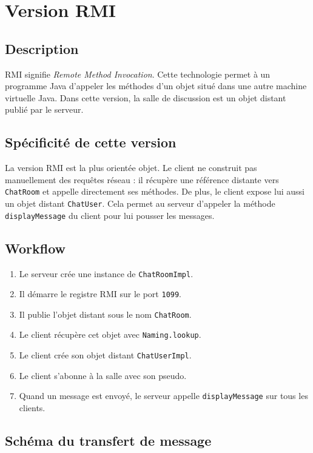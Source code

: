 \documentclass[12pt,a4paper]{report}
\begin{document}
\chapter{Version RMI}

\section{Description}

RMI signifie \textit{Remote Method Invocation}. Cette technologie permet à un programme Java d'appeler les méthodes d'un objet situé dans une autre machine virtuelle Java. Dans cette version, la salle de discussion est un objet distant publié par le serveur.

\section{Spécificité de cette version}

La version RMI est la plus orientée objet. Le client ne construit pas manuellement des requêtes réseau : il récupère une référence distante vers \texttt{ChatRoom} et appelle directement ses méthodes. De plus, le client expose lui aussi un objet distant \texttt{ChatUser}. Cela permet au serveur d'appeler la méthode \texttt{displayMessage} du client pour lui pousser les messages.

\section{Workflow}

\begin{enumerate}
    \item Le serveur crée une instance de \texttt{ChatRoomImpl}.
    \item Il démarre le registre RMI sur le port \texttt{1099}.
    \item Il publie l'objet distant sous le nom \texttt{ChatRoom}.
    \item Le client récupère cet objet avec \texttt{Naming.lookup}.
    \item Le client crée son objet distant \texttt{ChatUserImpl}.
    \item Le client s'abonne à la salle avec son pseudo.
    \item Quand un message est envoyé, le serveur appelle \texttt{displayMessage} sur tous les clients.
\end{enumerate}

\section{Schéma du transfert de message}
\end{document}
